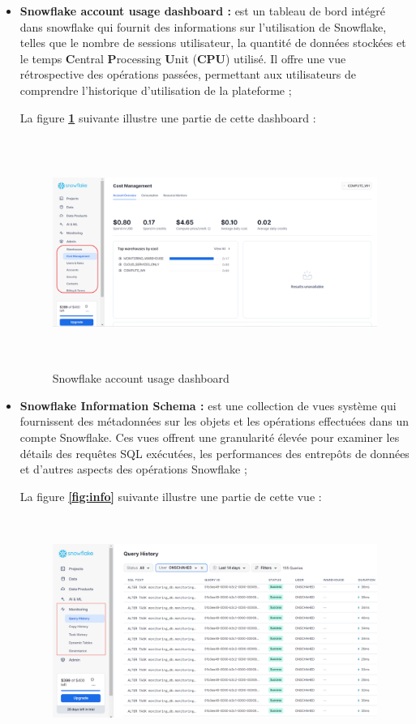 \begin{itemize}
    \item\textbf{Snowflake account usage dashboard :}  est un tableau de bord intégré dans snowflake qui fournit des informations sur l'utilisation de Snowflake, telles que le nombre de sessions utilisateur, 
    la quantité de données stockées et le temps \textbf{C}entral \textbf{P}rocessing \textbf{U}nit (\textbf{CPU}) utilisé.
    Il offre une vue rétrospective des opérations passées, permettant aux utilisateurs de comprendre l'historique d'utilisation de la plateforme ;
    \par La figure \textbf{\ref{fig:SAU}} suivante illustre une partie de cette dashboard :
            \begin{figure}[H]
            \centering
            \includegraphics[width =13cm, height=7.5cm]{img/captures/account_usage}
            \caption{Snowflake account usage dashboard}
            \label{fig:SAU}
            \end{figure}
    \item\textbf{Snowflake Information Schema :} est une collection de vues système qui fournissent des métadonnées sur les objets et les opérations effectuées dans un compte Snowflake. 
    Ces vues offrent une granularité élevée pour examiner les détails des requêtes SQL exécutées, les performances des entrepôts de données et d'autres aspects des opérations Snowflake ;
    \par La figure \textbf{\ref{fig:info}} suivante illustre une partie de cette vue :
            \begin{figure}[H]
            \centering
            \includegraphics[width =13cm, height=7.5cm]{img/captures/info}

\end{figure}
\end{itemize}

